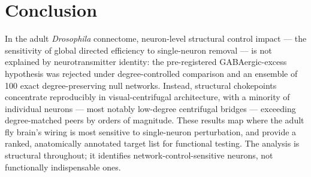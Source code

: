 \section{Conclusion}

In the adult \emph{Drosophila} connectome, neuron-level structural control
impact --- the sensitivity of global directed efficiency to single-neuron
removal --- is not explained by neurotransmitter identity: the
pre-registered GABAergic-excess hypothesis was rejected under
degree-controlled comparison and an ensemble of 100 exact
degree-preserving null networks. Instead, structural chokepoints
concentrate reproducibly in visual-centrifugal architecture, with a
minority of individual neurons --- most notably low-degree centrifugal
bridges --- exceeding degree-matched peers by orders of magnitude. These
results map where the adult fly brain's wiring is most sensitive to
single-neuron perturbation, and provide a ranked, anatomically annotated
target list for functional testing. The analysis is structural
throughout; it identifies network-control-sensitive neurons, not
functionally indispensable ones.
